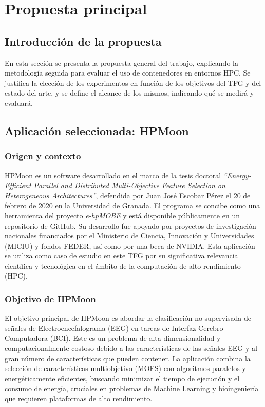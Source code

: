\chapter{Propuesta principal}\label{cap:propuesta}


\section{Introducción de la propuesta}\label{sec:introduccion_propuesta}
En esta sección se presenta la propuesta general del trabajo, explicando la metodología seguida para evaluar el uso de contenedores en entornos HPC. Se justifica la elección de los experimentos en función de los objetivos del TFG y del estado del arte, y se define el alcance de los mismos, indicando qué se medirá y evaluará.

\section{Aplicación seleccionada: HPMoon}\label{sec:hpm_application}

\subsection{Origen y contexto}\label{subsec:hpm_origen}
HPMoon es un software desarrollado en el marco de la tesis doctoral \textit{``Energy-Efficient Parallel and Distributed Multi-Objective Feature Selection on Heterogeneous Architectures''}, defendida por Juan José Escobar Pérez el 20 de febrero de 2020 en la Universidad de Granada. El programa se concibe como una herramienta del proyecto \textit{e-hpMOBE} y está disponible públicamente en un repositorio de GitHub. Su desarrollo fue apoyado por proyectos de investigación nacionales financiados por el Ministerio de Ciencia, Innovación y Universidades (MICIU) y fondos FEDER, así como por una beca de NVIDIA. Esta aplicación se utiliza como caso de estudio en este TFG por su significativa relevancia científica y tecnológica en el ámbito de la computación de alto rendimiento (\acs{HPC}).

\subsection{Objetivo de HPMoon}\label{subsec:hpm_objetivo}
El objetivo principal de HPMoon es abordar la clasificación no supervisada de señales de Electroencefalograma (\acs{EEG}) en tareas de Interfaz Cerebro-Computadora (\acs{BCI}). Este es un problema de alta dimensionalidad y computacionalmente costoso debido a las características de las señales \acs{EEG} y al gran número de características que pueden contener. La aplicación combina la selección de características multiobjetivo (\acs{MOFS}) con algoritmos paralelos y energéticamente eficientes, buscando minimizar el tiempo de ejecución y el consumo de energía, cruciales en problemas de \acs{Machine Learning} y bioingeniería que requieren plataformas de alto rendimiento.

